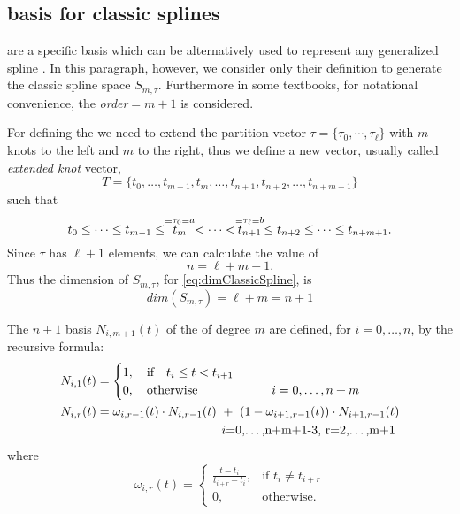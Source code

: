 \documentclass[dissertation.tex]{subfiles}
\begin{document}
\subsection{\bss basis for classic
  splines}\label{sec:bsplines}\index{\bss}
\emph{\bss} are a specific basis which can be alternatively used to
represent any generalized spline \cite{deboor}\cite{farin}\cite{salomon}\cite{bartels}. In this
paragraph, however, we consider only their definition to generate the
classic spline space $S_{m,\tau}$. Furthermore in some textbooks, for
notational convenience, the
\emph{order}$=m+1$ is considered.

For defining the \bss \cite{deboor} we need to extend the partition vector
$\tau=\{\tau_0,\cdots,\tau_\ell\}$ with $m$ knots to the left and $m$ to
the right, thus we define a new vector, usually called \emph{extended knot} vector,
$$
T=\{t_0,\dots,t_{m-1},t_{m},\dots,t_{n+1},t_{n+2},\dots,t_{n+m+1}\}
$$
such that
\begin{equation*}
  t_0\leq\dots\leq t_{m-1}\leq \stackrel{\equiv\tau_0\equiv a}{t_{m}}<\dots<\stackrel{\equiv\tau_\ell\equiv b}{t_{n+1}}\leq t_{n+2}\leq\dots\leq t_{n+m+1}.    
\end{equation*}
Since $\tau$ has $\ell+1$ elements, we can calculate the value of
$$
n=\ell+m-1.
$$
Thus the dimension of $S_{m,\tau}$, for
\cref{eq:dimClassicSpline}, is 
\begin{equation*}
  dim(S_{m,\tau})=\ell+m=n+1  
\end{equation*}

The $n+1$ basis $N_{i,m+1}(t)$ of the \bss of degree $m$ are defined,
for $i=0,\dots,n$, by the recursive formula:
\begin{align*}
  N_{i,1}(t) &=
  \begin{cases}
    1,\quad \mbox{if}\quad t_i\leq t<t_{i+1}\\
    0,\quad \mbox{otherwise}\qquad\qquad\qquad i=0,\dots,n+m
  \end{cases}\\
  N_{i,r}(t) &= \omega_{i,r-1}(t)\cdot N_{i,r-1}(t)\ +\
  (1-\omega_{i+1,r-1}(t))\cdot N_{i+1,r-1}(t)\\
             &\pushright i=0,\dots,n+m+1-3,\ r=2,\dots,m+1
\end{align*}
where
$$
\omega_{i,r}(t) = \begin{cases}
  \frac{t-t_i}{t_{i+r}-t_i},&\mbox{if }t_i\neq t_{i+r}\\
  0, &\mbox{otherwise.}
\end{cases}
$$
\end{document}
